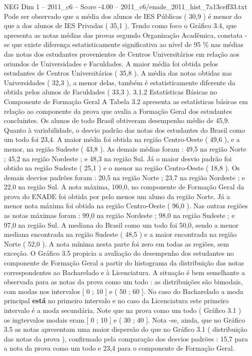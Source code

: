 \begin{textsample}{NEG Dim 1 – 2011\_c6 – Score -4.00 – 2011\_c6/enade\_2011\_hist\_7a13ceff33.txt}
Pode ser observado que a média dos alunos de IES Públicas ( 30,9 ) é menor do que a dos alunos de IES Privadas ( 35,1 ).
Tendo como foco o Gráfico 3.4, que apresenta as notas médias das provas segundo Organização Acadêmica, constata -se que existe diferença estatisticamente significativa ao nível de 95 \% nas médias das notas dos estudantes provenientes de Centros Universitários em relação aos oriundos de Universidades e Faculdades.
A maior média foi obtida pelos estudantes de Centros Universitários ( 35,8 ).
A média das notas obtidas nas Universidades ( 32,3 ), a menor delas, também é estatisticamente diferente da obtida pelos alunos de Faculdades ( 33,3 ). 3.1.2 Estatísticas Básicas no Componente de Formação Geral A Tabela 3.2 apresenta as estatísticas básicas em relação ao componente da prova que avalia a Formação Geral dos estudantes concluintes.
Os alunos de todo Brasil obtiveram desempenho médio de 45,9.
Quanto à variabilidade, o desvio padrão das notas dos estudantes do Brasil como um todo foi 23,4.
A maior média foi obtida na região Centro-Oeste ( 49,6 ), e a menor, na região Sudeste ( 43,8 ).
As demais médias foram : 49,5 na região Norte ; 45,2 na região Nordeste ; e 48,3 na região Sul.
Já o maior desvio padrão foi obtido na região Sudeste ( 25,1 ) e o menor na região Centro-Oeste ( 18,8 ).
Os demais desvios padrões foram : 20,5 na região Norte ; 23,7 na região Nordeste ; e 22,0 na região Sul.
A nota máxima, 100,0, no componente de Formação Geral da prova do ENADE foi obtida por pelo menos um aluno da região Norte.
Já a menor nota máxima foi obtida na região Centro-Oeste ( 96,0 ).
Nas outras regiões as notas máximas foram : 99,0 na região Nordeste ; 98,0 na região Sudeste ; e 97,0 na região Sul.
A mediana do Brasil como um todo foi 50,0, sendo a menor mediana encontrada na região Sudeste ( 48,5 ) e a maior encontrada na região Norte ( 52,0 ).
A nota mínima nesta parte foi zero em todas as regiões, sem exceção.
O Gráfico 3.5 propicia a avaliação do desempenho dos estudantes no componente de Formação Geral a partir do histograma da distribuição das notas correspondentes ao Bacharelado e à Licenciatura.
A situação é bem semelhante a observada para as notas da prova como um todo : as distribuições são bimodais, com modas nos intervalos [ 0 ; 10 ] e ( 50 ; 60 ].
No caso do Bacharelado a moda principal \textbf{está} no primeiro intervalo e no caso da Licenciatura este primeiro intervalo é a moda secundária.
Note que na prova como um todo ( Gráfico 3.1 ) os ingtervalos modais eram [ 0 ; 10 ] e ( 30 ; 40 ].
Nota -se, ainda, que no Gráfico 3.5 as notas apresentam uma maior dispersão do que no Gráfico 3.1 ( distribuição das notas da prova ), confirmado pela comparação dos desvios padrões : 15,7 para a nota da prova como um todo e 23,4 para o componente de Formação Geral.

\end{textsample}
